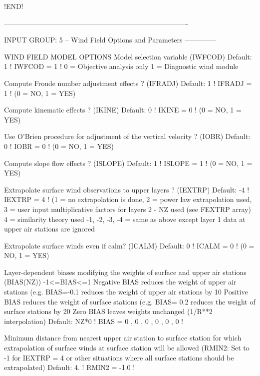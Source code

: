 \documentclass[a4paper,10pt]{article}
\begin{document}
!END!


-------------------------------------------------------------------------------

INPUT GROUP: 5 -- Wind Field Options and Parameters
--------------


    WIND FIELD MODEL OPTIONS
       Model selection variable (IWFCOD)     Default: 1      ! IWFCOD =  1  !
          0 = Objective analysis only
          1 = Diagnostic wind module

       Compute Froude number adjustment
       effects ? (IFRADJ)                    Default: 1      ! IFRADJ =  1  !
       (0 = NO, 1 = YES)

       Compute kinematic effects ? (IKINE)   Default: 0      ! IKINE  =  0  !
       (0 = NO, 1 = YES)

       Use O'Brien procedure for adjustment
       of the vertical velocity ? (IOBR)     Default: 0      ! IOBR =  0  !
       (0 = NO, 1 = YES)

       Compute slope flow effects ? (ISLOPE) Default: 1      ! ISLOPE  =  1  !
       (0 = NO, 1 = YES)

       Extrapolate surface wind observations
       to upper layers ? (IEXTRP)            Default: -4     ! IEXTRP =  4  !
       (1 = no extrapolation is done,
        2 = power law extrapolation used,
        3 = user input multiplicative factors
            for layers 2 - NZ used (see FEXTRP array)
        4 = similarity theory used
        -1, -2, -3, -4 = same as above except layer 1 data
            at upper air stations are ignored

       Extrapolate surface winds even
       if calm? (ICALM)                      Default: 0      ! ICALM  =  0  !
       (0 = NO, 1 = YES)

       Layer-dependent biases modifying the weights of
       surface and upper air stations (BIAS(NZ))
         -1<=BIAS<=1
       Negative BIAS reduces the weight of upper air stations
         (e.g. BIAS=-0.1 reduces the weight of upper air stations
       by 10%
       Positive BIAS reduces the weight of surface stations
         (e.g. BIAS= 0.2 reduces the weight of surface stations
       by 20%
       Zero BIAS leaves weights unchanged (1/R**2 interpolation)
       Default: NZ*0
                               ! BIAS =  0 ,  0 ,  0 ,  0 ,  0 ,  0  !

       Minimum distance from nearest upper air station
       to surface station for which extrapolation
       of surface winds at surface station will be allowed
       (RMIN2: Set to -1 for IEXTRP = 4 or other situations
        where all surface stations should be extrapolated)
                                             Default: 4.     ! RMIN2 = -1.0 !
\end{document}
